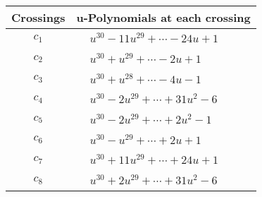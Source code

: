 \documentclass[1p]{elsarticle_modified}
\theoremstyle{definition}
\begin{document}
\begin{tabular}{m{50pt}|m{274pt}}
Crossings & \hspace{64pt}u-Polynomials at each crossing \\
\hline $$\begin{aligned}c_{1}\end{aligned}$$&$\begin{aligned}
&u^{30}-11 u^{29}+\cdots-24 u+1
\end{aligned}$\\
\hline $$\begin{aligned}c_{2}\end{aligned}$$&$\begin{aligned}
&u^{30}+u^{29}+\cdots-2 u+1
\end{aligned}$\\
\hline $$\begin{aligned}c_{3}\end{aligned}$$&$\begin{aligned}
&u^{30}+u^{28}+\cdots-4 u-1
\end{aligned}$\\
\hline $$\begin{aligned}c_{4}\end{aligned}$$&$\begin{aligned}
&u^{30}-2 u^{29}+\cdots+31 u^2-6
\end{aligned}$\\
\hline $$\begin{aligned}c_{5}\end{aligned}$$&$\begin{aligned}
&u^{30}-2 u^{29}+\cdots+2 u^2-1
\end{aligned}$\\
\hline $$\begin{aligned}c_{6}\end{aligned}$$&$\begin{aligned}
&u^{30}- u^{29}+\cdots+2 u+1
\end{aligned}$\\
\hline $$\begin{aligned}c_{7}\end{aligned}$$&$\begin{aligned}
&u^{30}+11 u^{29}+\cdots+24 u+1
\end{aligned}$\\
\hline $$\begin{aligned}c_{8}\end{aligned}$$&$\begin{aligned}
&u^{30}+2 u^{29}+\cdots+31 u^2-6
\end{aligned}$\\

\end{tabular}
\end{document}
